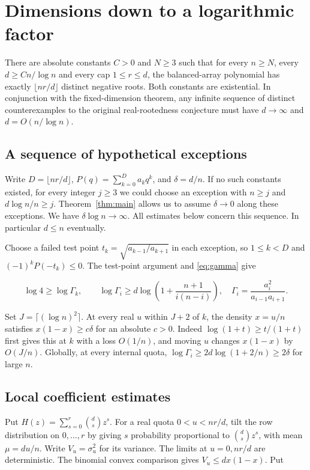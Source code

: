 \section{Dimensions down to a logarithmic factor}\label{sec:logarithmic}

\begin{theorem}\label{thm:logarithmic}
There are absolute constants $C>0$ and $N\ge3$ such that for every $n\ge N$, every $d\ge Cn/\log n$ and every cap $1\le r\le d$, the balanced-array polynomial has exactly $\lfloor nr/d\rfloor$ distinct negative roots. Both constants are existential. In conjunction with the fixed-dimension theorem, any infinite sequence of distinct counterexamples to the original real-rootedness conjecture must have $d\to\infty$ and $d=O(n/\log n)$.
\end{theorem}

\subsection{A sequence of hypothetical exceptions}

Write $D=\lfloor nr/d\rfloor$, $P(q)=\sum_{k=0}^D a_kq^k$, and $\delta=d/n$. If no such constants existed, for every integer $j\ge3$ we could choose an exception with $n\ge j$ and $d\log n/n\ge j$. Theorem~\ref{thm:main} allows us to assume $\delta\to0$ along these exceptions. We have $\delta\log n\to\infty$. All estimates below concern this sequence. In particular $d\le n$ eventually.

Choose a failed test point $t_k=\sqrt{a_{k-1}/a_{k+1}}$ in each exception, so $1\le k<D$ and $(-1)^kP(-t_k)\le0$. The test-point argument and \eqref{eq:gamma} give

\[
\log4\ge\log\Gamma_k,\qquad
\log\Gamma_i\ge d\log\left(1+\frac{n+1}{i(n-i)}\right),\quad
\Gamma_i=\frac{a_i^2}{a_{i-1}a_{i+1}}.
\]

Set $J=\lceil(\log n)^2\rceil$. At every real $u$ within $J+2$ of $k$, the density $x=u/n$ satisfies $x(1-x)\ge c\delta$ for an absolute $c>0$. Indeed $\log(1+t)\ge t/(1+t)$ first gives this at $k$ with a loss $O(1/n)$, and moving $u$ changes $x(1-x)$ by $O(J/n)$. Globally, at every internal quota, $\log\Gamma_i\ge 2d\log(1+2/n)\ge 2\delta$ for large $n$.

\subsection{Local coefficient estimates}

Put $H(z)=\sum_{s=0}^r\binom ds z^s$. For a real quota $0<u<nr/d$, tilt the row distribution on $0,\ldots,r$ by giving $s$ probability proportional to $\binom ds z^s$, with mean $\mu=du/n$. Write $V_u=\sigma_u^2$ for its variance. The limits at $u=0,nr/d$ are deterministic. The binomial convex comparison gives $V_u\le dx(1-x)$. Put

